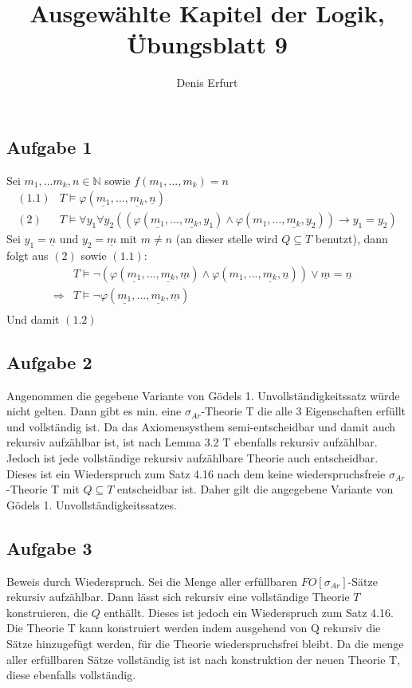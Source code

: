 \documentclass[12pt]{article}
\begin{document}
\title{Ausgewählte Kapitel der Logik, Übungsblatt 9}
\author{Denis Erfurt}
\maketitle



\subsection*{Aufgabe 1}
Sei $m_1,...m_k,n\in \mathbb N$ sowie $f(m_1,...,m_k)=n$
\begin{align}
  (1.1) & T \models \varphi(\underline{m_1}, ..., \underline{m_k}, \underline{n}) \\
  (2)   & T \models \forall y_1 \forall y_2 ((\varphi(\underline{m_1}, ..., \underline{m_k}, y_1) \land \varphi(m_1, ..., \underline{m_k}, y_2)) \rightarrow y_1 = y_2)
\end{align}
Sei $y_1 = \underline{n}$ und $y_2 = \underline m$ mit $m\neq n$ (an dieser stelle wird $Q\subseteq T$ benutzt), dann folgt aus $(2)$ sowie $(1.1)$:
\begin{align}
  &T\models \neg (\varphi(\underline{m_1}, ..., \underline{m_k}, \underline{m}) \land \varphi(m_1, ..., \underline{m_k}, \underline{n})) \lor \underline{m} = \underline{n} \\
  \Rightarrow & T\models \neg \varphi(\underline{m_1}, ..., \underline{m_k}, \underline{m}) & \text{}\\
\end{align}
Und damit $(1.2)$

\subsection*{Aufgabe 2}
Angenommen die gegebene Variante von Gödels 1. Unvollständigkeitssatz würde nicht
gelten. Dann gibt es min. eine $\sigma_{Ar}$-Theorie T die alle 3 Eigenschaften
erfüllt und vollständig ist. Da das Axiomensysthem semi-entscheidbar und damit
auch rekursiv aufzählbar ist, ist nach Lemma 3.2 T ebenfalls rekursiv aufzählbar.
Jedoch ist jede vollständige rekursiv aufzählbare Theorie auch entscheidbar. Dieses
ist ein Wiederspruch zum Satz 4.16 nach dem keine wiederspruchsfreie $\sigma_{Ar}$
-Theorie T mit $Q\subseteq T$ entscheidbar ist. Daher gilt die angegebene Variante
von Gödels 1. Unvollständigkeitssatzes.
\subsection*{Aufgabe 3}
Beweis durch Wiederspruch. Sei die Menge aller erfüllbaren $FO[\sigma_{Ar}]$-Sätze
rekursiv aufzählbar. Dann lässt sich rekursiv eine vollständige Theorie $T$ konstruieren,
die $Q$ enthällt. Dieses ist jedoch ein Wiederspruch zum Satz 4.16.
Die Theorie T kann konstruiert werden indem ausgehend von Q rekursiv die Sätze
hinzugefügt werden, für die Theorie wiederspruchsfrei bleibt. Da die menge aller
erfüllbaren Sätze vollständig ist ist nach konstruktion der neuen Theorie T, diese
ebenfalls vollständig.
\end{document}
